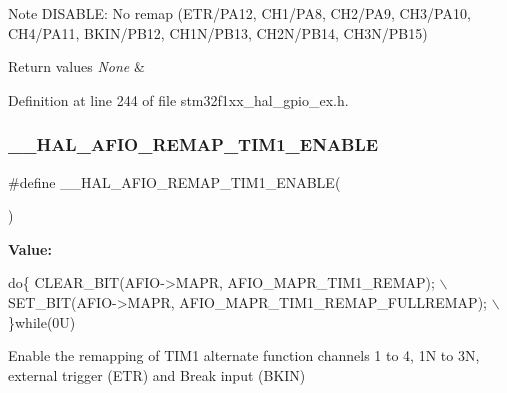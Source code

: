 \begin{DoxyNote}{Note}
D\+I\+S\+A\+B\+LE\+: No remap (E\+T\+R/\+P\+A12, C\+H1/\+P\+A8, C\+H2/\+P\+A9, C\+H3/\+P\+A10, C\+H4/\+P\+A11, B\+K\+I\+N/\+P\+B12, C\+H1\+N/\+P\+B13, C\+H2\+N/\+P\+B14, C\+H3\+N/\+P\+B15) 
\end{DoxyNote}

\begin{DoxyRetVals}{Return values}
{\em None} & \\
\hline
\end{DoxyRetVals}


Definition at line 244 of file stm32f1xx\+\_\+hal\+\_\+gpio\+\_\+ex.\+h.

\mbox{\label{group___g_p_i_o_ex___a_f_i_o___a_f___r_e_m_a_p_p_i_n_g_gaef7a1246d22973634c293094a2418200}} 
\subsubsection{\texorpdfstring{\+\_\+\+\_\+\+H\+A\+L\+\_\+\+A\+F\+I\+O\+\_\+\+R\+E\+M\+A\+P\+\_\+\+T\+I\+M1\+\_\+\+E\+N\+A\+B\+LE}{\_\_HAL\_AFIO\_REMAP\_TIM1\_ENABLE}}
{\footnotesize\ttfamily \#define \+\_\+\+\_\+\+H\+A\+L\+\_\+\+A\+F\+I\+O\+\_\+\+R\+E\+M\+A\+P\+\_\+\+T\+I\+M1\+\_\+\+E\+N\+A\+B\+LE(\begin{DoxyParamCaption}{ }\end{DoxyParamCaption})}

{\bfseries Value\+:}
\begin{DoxyCode}
\textcolor{keywordflow}{do}\{ CLEAR\_BIT(AFIO->MAPR, AFIO\_MAPR\_TIM1\_REMAP);         \(\backslash\)
                                            SET\_BIT(AFIO->MAPR, AFIO\_MAPR\_TIM1\_REMAP\_FULLREMAP); \(\backslash\)
                                          \}\textcolor{keywordflow}{while}(0U)
\end{DoxyCode}


Enable the remapping of T\+I\+M1 alternate function channels 1 to 4, 1N to 3N, external trigger (E\+TR) and Break input (B\+K\+IN) 

